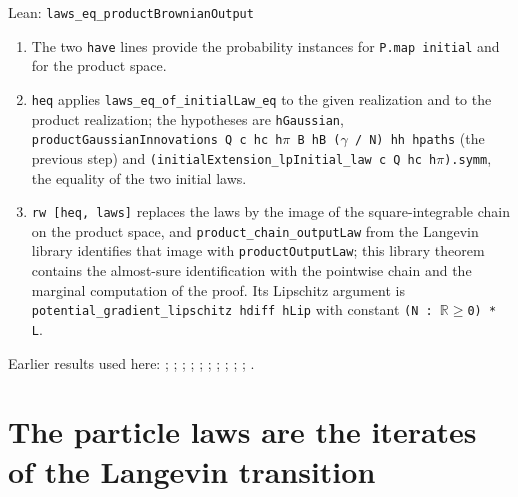 \documentclass[11pt,a4paper]{article}
\begin{document}
\begin{leanbox}{Lean: \texttt{laws\_\allowbreak{}eq\_\allowbreak{}productBrownianOutput}}
\begin{enumerate}


\item The two \texttt{have} lines provide the probability instances for \texttt{P.\allowbreak{}map initial} and for the product space.

\item \texttt{heq} applies \texttt{laws\_\allowbreak{}eq\_\allowbreak{}of\_\allowbreak{}initial\allowbreak{}Law\_\allowbreak{}eq} to the given realization and to the product realization; the hypotheses are \texttt{h\allowbreak{}Gaussian}, \texttt{product\allowbreak{}Gaussian\allowbreak{}Innovations Q c hc h\ensuremath{\pi} B h\allowbreak{}B (\ensuremath{\gamma} /\allowbreak{} N) hh hpaths} (the previous step) and \texttt{(initial\allowbreak{}Extension\_\allowbreak{}lp\allowbreak{}Initial\_\allowbreak{}law c Q hc h\ensuremath{\pi}).\allowbreak{}symm}, the equality of the two initial laws.

\item \texttt{rw [heq, laws]} replaces the laws by the image of the square-integrable chain on the product space, and \texttt{product\_\allowbreak{}chain\_\allowbreak{}output\allowbreak{}Law} from the Langevin library identifies that image with \texttt{product\allowbreak{}Output\allowbreak{}Law}; this library theorem contains the almost-sure identification with the pointwise chain and the marginal computation of the proof. Its Lipschitz argument is \texttt{potential\_\allowbreak{}gradient\_\allowbreak{}lipschitz hdiff h\allowbreak{}Lip} with constant \texttt{(N : \ensuremath{\mathbb R}\ensuremath{\ge}0) * L}.

\end{enumerate}
\end{leanbox}


Earlier results used here: \cite[Section~3.17.1]{LangevinLean2026ULASC}; \cite[Section~3.17.2]{LangevinLean2026ULASC}; \cite[Section~3.22.19]{LangevinLean2026ULASC}; \cite[Section~3.22.2]{LangevinLean2026ULASC}; \cite[Section~3.22.21]{LangevinLean2026ULASC}; \cite[Section~3.22.3]{LangevinLean2026ULASC}; \cite[Section~3.23.5]{LangevinLean2026ULASC}; \cite[Section~3.23.7]{LangevinLean2026ULASC}; \cite[Section~3.23.9]{LangevinLean2026ULASC}; \cite[Section~3.32.4]{LangevinLean2026ULASC}; \cite[Section~3.32.5]{LangevinLean2026ULASC}.

\section{\texorpdfstring{The particle laws are the iterates of the Langevin transition}{The particle laws are the iterates of the Langevin transition}}
\end{document}
